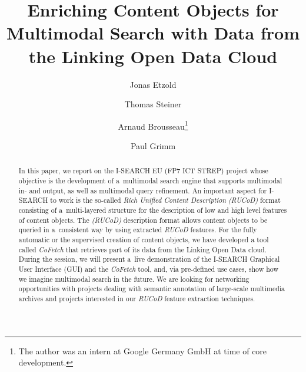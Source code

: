 \documentclass[runningheads,a4paper]{llncs}
\begin{document}
\mainmatter

\title{Enriching Content Objects for Multimodal Search with Data from the Linking Open Data Cloud}

\author{Jonas Etzold \and Thomas Steiner \and Arnaud Brousseau\thanks{The author was an intern at Google Germany GmbH at time of core development.} \and Paul Grimm}


\maketitle

\setcounter{footnote}{0}

\begin{abstract}
In this paper, we report on the \mbox{I-SEARCH} EU (FP7 ICT STREP) project
whose objective is the development of a~multimodal search engine that supports multimodal
in- and output, as well as multimodal query refinement.
An important aspect for \mbox{I-SEARCH} to work is the so-called
\emph{Rich Unified Content Description} \emph{\mbox{(RUCoD)}} format
consisting of a~multi-layered structure
for the description of low and high level features of content objects.
The \emph{\mbox{(RUCoD)}} description format allows content objects
to be queried in a~consistent way by using extracted \mbox{\emph{RUCoD}} features.
For the fully automatic or the supervised creation of content objects,
we have developed a tool called \mbox{\emph{CoFetch}}
that retrieves part of its data from the Linking Open Data cloud.
During the session, we will present a~live demonstration of the \mbox{I-SEARCH}
Graphical User Interface (GUI) and the \mbox{\emph{CoFetch}} tool, and,
via pre-defined use cases, show how we imagine multimodal search in the future.
We are looking for networking opportunities with projects dealing with
semantic annotation of large-scale multimedia archives and 
projects interested in our \emph{RUCoD} feature extraction techniques.
\end{abstract}
\end{document}
